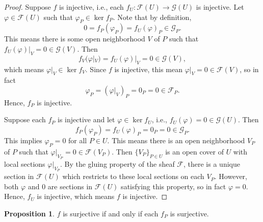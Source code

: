 \documentclass[12pt]{article}
\theoremstyle{definition}
\newtheorem{proposition}{Proposition}
\renewcommand{\phi}{\varphi}
\newcommand{\<}{\langle}
\renewcommand{\>}{\rangle}
\newcommand{\FF}{\mathcal{F}}
\newcommand{\GG}{\mathcal{G}}
\begin{document}
\begin{proof}
    Suppose $f$ is injective, i.e., each $f_U : \FF(U) \to \GG(U)$ is injective.
    Let $\phi \in \FF(U)$ such that $\phi_P \in \ker f_P$.
    Note that by definition,
    \[
        0 = f_P(\phi_P) = f_U(\phi)_P \in \GG_P.
    \]
    This means there is some open neighborhood $V$ of $P$ such that $f_U(\phi)|_V = 0 \in \GG(V)$.
    Then
    \[
        f_V(\phi|_V) = f_U(\phi)|_V = 0 \in \GG(V),
    \]
    which means $\phi|_V \in \ker f_V$.
    Since $f$ is injective, this mean $\phi|_V = 0 \in \FF(V)$, so in fact
    \[
        \phi_P = (\phi|_V)_P = 0_P = 0 \in \FF_P.
    \]
    Hence, $f_P$ is injective.

    Suppose each $f_P$ is injective and let $\phi \in \ker f_U$, i.e., $f_U(\phi) = 0 \in \GG(U)$.
    Then
    \[
        f_P(\phi_P) = f_U(\phi)_P = 0_P = 0 \in \GG_P.
    \]
    This implies $\phi_P = 0$ for all $P \in U$.
    This means there is an open neighborhood $V_P$ of $P$ such that $\phi|_{V_P} = 0 \in \FF(V_P)$.
    Then $\{V_P\}_{P \in U}$ is an open cover of $U$ with local sections $\phi|_{V_P}$.
    By the gluing property of the sheaf $\FF$, there is a unique section in $\FF(U)$ which restricts to these local sections on each $V_P$.
    However, both $\phi$ and $0$ are sections in $\FF(U)$ satisfying this property, so in fact $\phi = 0$.
    Hence, $f_U$ is injective, which means $f$ is injective.
\end{proof}

\begin{proposition}
    $f$ is surjective if and only if each $f_P$ is surjective.
\end{proposition}
\end{document}
